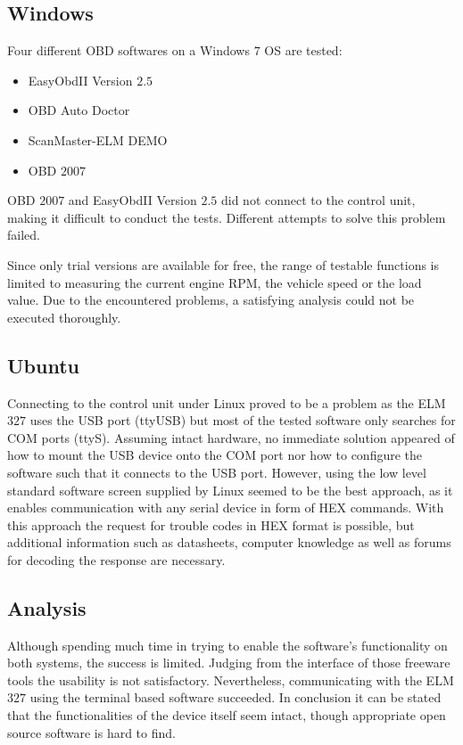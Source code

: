 \subsection{Windows}
Four different OBD softwares on a Windows $7$ OS are tested:

\begin{itemize}
 \item EasyObdII Version $2.5$
 \item OBD Auto Doctor
 \item ScanMaster-ELM DEMO
 \item OBD $2007$
\end{itemize}

OBD $2007$ and EasyObdII Version $2.5$ did not connect to the control unit, making it difficult to conduct the tests. 
Different attempts to solve this problem failed.

Since only trial versions are available for free, the range of testable functions is limited to measuring the current engine RPM, the vehicle 
speed or the load value. Due to the encountered problems, a satisfying analysis could not be executed thoroughly.

\subsection{Ubuntu}
Connecting to the control unit under Linux proved to be a problem as the ELM$327$ uses the USB port (ttyUSB) but most of the tested software only 
searches for COM ports (ttyS).
Assuming intact hardware, no immediate solution appeared of how to mount the USB device onto the COM port nor how to configure the software such that 
it connects to the USB port. However, using the low level standard software screen supplied by Linux seemed to be the best approach, as it enables 
communication with any serial device in form of HEX commands. With this approach the request for trouble codes in HEX format is possible, but 
additional information such as datasheets, computer knowledge as well as forums for decoding the response are necessary.

\subsection{Analysis}
Although spending much time in trying to enable the software’s functionality on both systems, the success is limited. Judging from the interface of 
those freeware tools the usability is not satisfactory. Nevertheless, communicating with the ELM$327$ using the terminal based software succeeded. 
In conclusion it can be stated that the functionalities of the device itself seem intact, though appropriate open source software is hard to 
find.

